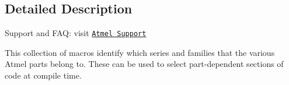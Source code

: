 \subsection{Detailed Description}
Support and F\-A\-Q\-: visit \href{http://www.atmel.com/design-support/}{\tt Atmel Support}

This collection of macros identify which series and families that the various Atmel parts belong to. These can be used to select part-\/dependent sections of code at compile time. 